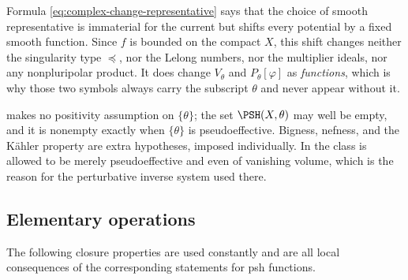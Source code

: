 Formula \eqref{eq:complex-change-representative} says that the choice of
smooth representative is immaterial for the current but shifts every
potential by a fixed smooth function.  Since $f$ is bounded on the
compact $X$, this shift changes neither the singularity type
$\preceq$, nor the Lelong numbers, nor the multiplier ideals, nor any
nonpluripolar product.  It does change $V_\theta$ and
$P_\theta[\varphi]$ as \emph{functions}, which is why those two symbols
always carry the subscript $\theta$ and never appear without it.

\begin{remark}
\label{rem:ch51-no-positivity-assumed}
 makes no positivity assumption on
$\{\theta\}$; the set $\PSH(X,\theta)$ may well be empty, and it is
nonempty exactly when $\{\theta\}$ is pseudoeffective.  Bigness,
nefness, and the K\"ahler property are extra hypotheses, imposed
individually.  In  the class is allowed
to be merely pseudoeffective and even of vanishing volume, which is the
reason for the perturbative inverse system used there.
\end{remark}

\subsection{Elementary operations}
\label{sec:ch51-operations}

The following closure properties are used constantly and are all local
consequences of the corresponding statements for psh functions.


